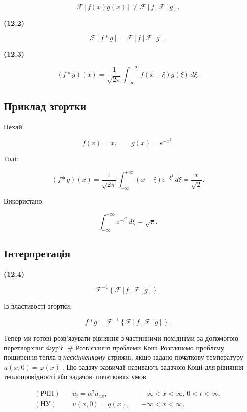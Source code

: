 \documentclass[
  ukrainian,
]{article}
\begin{document}
\[
\mathcal{F}[f(x)g(x)] \neq \mathcal{F}[f]\mathcal{F}[g].
\]

\textbf{(12.2)}

\[
\mathcal{F}[f*g] = \mathcal{F}[f]\mathcal{F}[g].
\]

\textbf{(12.3)}

\[
(f*g)(x) = \frac{1}{\sqrt{2\pi}} \int_{-\infty}^{+\infty} f(x-\xi)g(\xi)\,d\xi.
\]

\subsection{Приклад
згортки}\label{ux43fux440ux438ux43aux43bux430ux434-ux437ux433ux43eux440ux442ux43aux438}

Нехай:

\[
f(x) = x, \qquad g(x) = e^{-x^2}.
\]

Тоді:

\[
(f*g)(x) = \frac{1}{\sqrt{2\pi}} \int_{-\infty}^{+\infty} (x-\xi)e^{-\xi^2}\,d\xi = \frac{x}{\sqrt{2}}.
\]

Використано:

\[
\int_{-\infty}^{+\infty} e^{-\xi^2}\,d\xi = \sqrt{\pi}.
\]

\subsection{Інтерпретація}\label{ux456ux43dux442ux435ux440ux43fux440ux435ux442ux430ux446ux456ux44f}

\textbf{(12.4)}

\[
\mathcal{F}^{-1}\left\{\mathcal{F}[f]\mathcal{F}[g]\right\}.
\]

Із властивості згортки:

\[
f * g = \mathcal{F}^{-1}\left\{\mathcal{F}[f]\mathcal{F}[g]\right\}.
\]

Тепер ми готові розв'язувати рівняння з частинними похідними за
допомогою перетворення Фур'є. \# Розв'язання проблеми Коші Розглянемо
проблему поширення тепла в \emph{нескінченному} стрижні, якщо задано
початкову температуру \(u(x, 0) = \varphi(x)\) . Цю задачу зазвичай
називають задачою Коші для рівняння теплопровідності або задачою
початкових умов

\[
\begin{aligned}
(\text{РЧП})\quad & u_t=\alpha^2u_{xx}, && -\infty<x<\infty,\ 0<t<\infty,\\
(\text{НУ})\quad & u(x,0)=q(x), && -\infty<x<\infty.
\end{aligned}
\]
\end{document}
